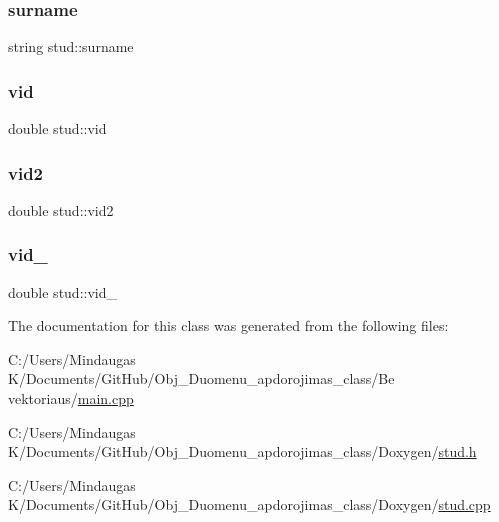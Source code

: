 \mbox{\label{structstud_a143c49ac194e6accadc52369f551512f}} 
\subsubsection{\texorpdfstring{surname}{surname}}
{\footnotesize\ttfamily string stud\+::surname}

\mbox{\label{structstud_a28f618368f8994401c1a1c7bc15f9a6f}} 
\subsubsection{\texorpdfstring{vid}{vid}}
{\footnotesize\ttfamily double stud\+::vid}

\mbox{\label{structstud_a234cd7d84de22499f5c83e4ecdac4594}} 
\subsubsection{\texorpdfstring{vid2}{vid2}}
{\footnotesize\ttfamily double stud\+::vid2}

\mbox{\label{structstud_ae99025f9afbdc0da6db9a4375bc3beef}} 
\subsubsection{\texorpdfstring{vid\_}{vid\_}}
{\footnotesize\ttfamily double stud\+::vid\+\_\+\hspace{0.3cm}{\ttfamily [private]}}



The documentation for this class was generated from the following files\+:\begin{DoxyCompactItemize}
\item 
C\+:/\+Users/\+Mindaugas K/\+Documents/\+Git\+Hub/\+Obj\+\_\+\+Duomenu\+\_\+apdorojimas\+\_\+class/\+Be vektoriaus/\mbox{\hyperlink{_be_01vektoriaus_2main_8cpp}{main.\+cpp}}\item 
C\+:/\+Users/\+Mindaugas K/\+Documents/\+Git\+Hub/\+Obj\+\_\+\+Duomenu\+\_\+apdorojimas\+\_\+class/\+Doxygen/\mbox{\hyperlink{_doxygen_2_stud_8h}{stud.\+h}}\item 
C\+:/\+Users/\+Mindaugas K/\+Documents/\+Git\+Hub/\+Obj\+\_\+\+Duomenu\+\_\+apdorojimas\+\_\+class/\+Doxygen/\mbox{\hyperlink{_doxygen_2_stud_8cpp}{stud.\+cpp}}\end{DoxyCompactItemize}
